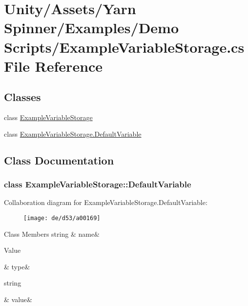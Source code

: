 \hypertarget{a00110}{\section{Unity/\-Assets/\-Yarn Spinner/\-Examples/\-Demo Scripts/\-Example\-Variable\-Storage.cs File Reference}
\label{a00110}
}
\subsection*{Classes}
\begin{DoxyCompactItemize}
\item 
class \hyperlink{a00033}{Example\-Variable\-Storage}
\item 
class \hyperlink{a00033_d6/d7d/a00161}{Example\-Variable\-Storage.\-Default\-Variable}
\end{DoxyCompactItemize}


\subsection{Class Documentation}
\label{d6/d7d/a00161}
\hypertarget{a00033_d6/d7d/a00161}{}
\subsubsection{class Example\-Variable\-Storage\-:\-:Default\-Variable}


Collaboration diagram for Example\-Variable\-Storage.\-Default\-Variable\-:
\nopagebreak
\begin{figure}[H]
\begin{center}
\leavevmode
\texttt{[image: de/d53/a00169]}
\end{center}
\end{figure}
\begin{DoxyFields}{Class Members}
\hypertarget{a00033_a609feaa53936e7dc42248ff2ba68454a}{string}\label{a00033_a609feaa53936e7dc42248ff2ba68454a}
&
name&
\\
\hline

\hypertarget{a00033_a904347efdca12f40243c7dedb646153d}{Value}\label{a00033_a904347efdca12f40243c7dedb646153d}
&
type&
\\
\hline

\hypertarget{a00033_a0f00ecb21b58aa754a4bbb61edf62818}{string}\label{a00033_a0f00ecb21b58aa754a4bbb61edf62818}
&
value&
\\
\hline

\end{DoxyFields}
